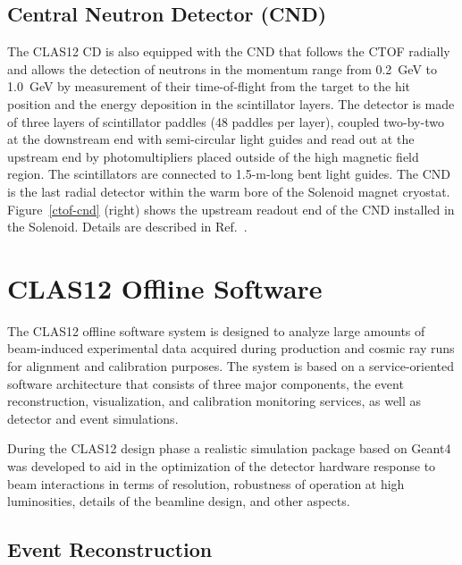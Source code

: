 \documentclass[final,3p,twocolumn]{elsarticle}
\begin{document}
\subsection{Central Neutron Detector (CND)}

The CLAS12 CD is also equipped with the CND that follows the CTOF radially and allows the detection of neutrons in
the momentum range from 0.2~GeV to 1.0~GeV by measurement of their time-of-flight from the target to the hit
position and the energy deposition in the scintillator layers. The detector is made of three layers of scintillator
paddles (48 paddles per layer), coupled two-by-two at the downstream end with semi-circular light guides and read out
at the upstream end by photomultipliers placed outside of the high magnetic field region. The scintillators are connected
to 1.5-m-long bent light guides. The CND is the last radial detector within the warm bore of the Solenoid magnet cryostat. 
Figure~\ref{ctof-cnd} (right) shows the upstream readout end of the CND installed in the Solenoid. Details are described
in Ref.~\cite{CTOF}.

\section{CLAS12 Offline Software}  

The CLAS12 offline software system is designed to analyze large amounts of beam-induced experimental data
acquired during production and cosmic ray runs for alignment and calibration purposes. The system is based on a
service-oriented software architecture that consists of three major components, the event reconstruction,
visualization, and calibration monitoring services, as well as detector and event simulations. 

During the CLAS12 design phase a realistic simulation package based on Geant4 was developed to aid in the optimization 
of the detector hardware response to beam interactions in terms of resolution, robustness of operation at high
luminosities, details of the beamline design, and other aspects. 

\subsection{Event Reconstruction} 
\end{document}
